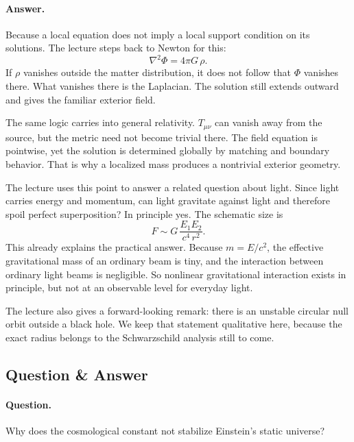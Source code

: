 \paragraph{Answer.} Because a local equation does not imply a local support condition on its solutions. The lecture steps back to Newton for this:
\begin{equation}
\nabla^2\Phi=4\pi G\,\rho.
\end{equation}
If \(\rho\) vanishes outside the matter distribution, it does not follow that \(\Phi\) vanishes there. What vanishes there is the Laplacian. The solution still extends outward and gives the familiar exterior field.

The same logic carries into general relativity. \(T_{\mu\nu}\) can vanish away from the source, but the metric need not become trivial there. The field equation is pointwise, yet the solution is determined globally by matching and boundary behavior. That is why a localized mass produces a nontrivial exterior geometry.

The lecture uses this point to answer a related question about light. Since light carries energy and momentum, can light gravitate against light and therefore spoil perfect superposition? In principle yes. The schematic size is
\begin{equation}
F\sim G\,\frac{E_1E_2}{c^4\,r^2}.
\end{equation}
This already explains the practical answer. Because \(m=E/c^2\), the effective gravitational mass of an ordinary beam is tiny, and the interaction between ordinary light beams is negligible. So nonlinear gravitational interaction exists in principle, but not at an observable level for everyday light.

The lecture also gives a forward-looking remark: there is an unstable circular null orbit outside a black hole. We keep that statement qualitative here, because the exact radius belongs to the Schwarzschild analysis still to come.

\subsection{Question \& Answer}

\paragraph{Question.} Why does the cosmological constant not stabilize Einstein's static universe?

